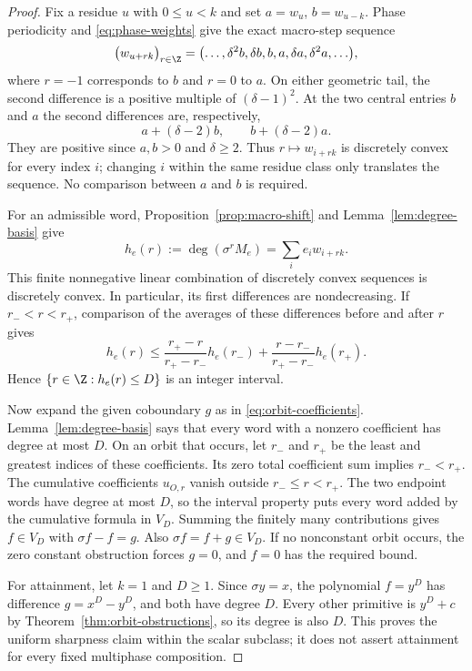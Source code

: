 \begin{proof}
Fix a residue $u$ with $0\le u<k$ and set
$a=w_u$, $b=w_{u-k}$.  Phase periodicity and
\eqref{eq:phase-weights} give the exact macro-step sequence
\begin{equation}
  \bigl(w_{u+rk}\bigr)_{r\in\Z}
  =\bigl(\ldots,\delta^2b,\delta b,b,a,
                 \delta a,\delta^2a,\ldots\bigr),
  \label{eq:macro-weight-sequence}
\end{equation}
where $r=-1$ corresponds to $b$ and $r=0$ to $a$.
On either geometric tail, the second difference is a positive
multiple of $(\delta-1)^2$.  At the two central entries $b$ and $a$
the second differences are, respectively,
\begin{equation}
  a+(\delta-2)b,\qquad b+(\delta-2)a.
  \label{eq:central-second-differences}
\end{equation}
They are positive since $a,b>0$ and $\delta\ge2$.
Thus $r\mapsto w_{i+rk}$ is discretely convex for every index $i$;
changing $i$ within the same residue class only translates the sequence.
No comparison between $a$ and $b$ is required.

For an admissible word, Proposition~\ref{prop:macro-shift} and
Lemma~\ref{lem:degree-basis} give
\[
  h_e(r):=\deg(\sigma^rM_e)=\sum_i e_iw_{i+rk}.
\]
This finite nonnegative linear combination of discretely convex
sequences is discretely convex.  In particular, its first differences
are nondecreasing.  If $r_-<r<r_+$, comparison of the averages of
these differences before and after $r$ gives
\[
  h_e(r)\le
  \frac{r_+-r}{r_+-r_-}h_e(r_-)
  +\frac{r-r_-}{r_+-r_-}h_e(r_+).
\]
Hence $\{r\in\Z:h_e(r)\le D\}$ is an integer interval.

Now expand the given coboundary $g$ as in
\eqref{eq:orbit-coefficients}.  Lemma~\ref{lem:degree-basis} says
that every word with a nonzero coefficient has degree at most $D$.
On an orbit that occurs, let $r_-$ and $r_+$ be the least and greatest
indices of these coefficients.  Its zero total coefficient sum implies
$r_-<r_+$.  The cumulative coefficients $u_{O,r}$ vanish outside
$r_-\le r<r_+$.  The two endpoint words have degree at most $D$,
so the interval property puts every word added by the cumulative
formula in $V_D$.  Summing the finitely many contributions gives
$f\in V_D$ with $\sigma f-f=g$.  Also $\sigma f=f+g\in V_D$.
If no nonconstant orbit occurs, the zero constant obstruction forces
$g=0$, and $f=0$ has the required bound.

For attainment, let $k=1$ and $D\ge1$.  Since $\sigma y=x$,
the polynomial $f=y^D$ has difference $g=x^D-y^D$, and both have
degree $D$.  Every other primitive is $y^D+c$ by
Theorem~\ref{thm:orbit-obstructions}, so its degree is also $D$.
This proves the uniform sharpness claim within the scalar subclass;
it does not assert attainment for every fixed multiphase composition.
\end{proof}


